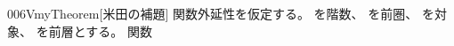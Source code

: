 \documentclass[index]{subfiles}
\begin{document}
\begin{myBlock}{006V}{myTheorem}[米田の補題]
  関数外延性を仮定する。
  を階数、
  を前圏、
  を対象、
  を前層とする。
  関数
\end{myBlock}
\end{document}
